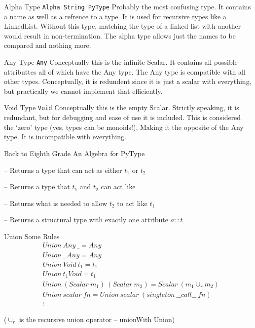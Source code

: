\documentclass[12pt,t]{beamer}
\newcommand{\subt}[1]{{\footnotesize \color{subtitle} {#1}}}
\newcommand{\codehs}{\texttt}
\newcommand{\vitem}{\vfill\item}
\begin{document}
\begin{frame}{Alpha Type}
    \vfill
    \codehs{Alpha String PyType}
    \vfill
    Probably the most confusing type. It contains a name as well
    as a refrence to a type. It is used for recursive types like
    a LinkedList. Without this type, matching the type of a linked
    list with another would result in non-termination. The alpha
    type allows just the names to be compared and nothing more.
    \vfill
\end{frame}

\begin{frame}{Any Type}
    \vfill
    \codehs{Any}
    \vfill
    Conceptually this is the infinite Scalar. It contains all
    possible attributtes all of which have the Any type. The
    Any type is compatible with all other types. Conceptually,
    it is redundent since it is just a scalar with everything,
    but practically we cannot implement that efficiently.
    \vfill
\end{frame}

\begin{frame}{Void Type}
    \vfill
    \codehs{Void}
    \vfill
    Conceptually this is the empty Scalar. Strictly speaking, it
    is redundant, but for debugging and ease of use it is included. This
    is considered the `zero' type (yes, types can be monoids!),
    Making it the opposite of the Any type. It is incompatible with everything.
    \vfill
\end{frame}

\begin{frame}{Back to Eighth Grade}
    \subt{An Algebra for PyType}

    \begin{description}
        \vitem[Union $t_1$ $t_2$] -- Returns a type that can act as either $t_1$ or $t_2$
        \vitem[Intersection $t_1$ $t_2$] -- Returns a type that $t_1$ and $t_2$ can act like
        \vitem[Difference $t_1$ $t_2$] -- Returns what is needed to allow $t_2$ to act like $t_1$
        \vitem[Singleton $a$ $t$] -- Returns a structural type with exactly one attribute $a::t$
    \end{description}
\end{frame}

\begin{frame}{Union}
    \subt{Some Rules}
    \[
      \begin{array}{ll}
          & Union\ Any\ \_ = Any \\
          & Union\ \_\ Any = Any \\
          & Union\ Void\ t_1 = t_1 \\
          & Union\ t_1 Void = t_1 \\
          & Union\ (Scalar\ m_1)\ (Scalar\ m_2) = Scalar\ (m_1\cup_r m_2) \\
          & Union\ scalar\ fn = Union\ scalar\ (singleton\ \_\_call\_\_\ fn) \\
          & \vdots
    \end{array}
    \]

    \vfill
    \centering\tiny{($\cup_r$ is the recursive union operator -- unionWith Union)}
\end{frame}
\end{document}
